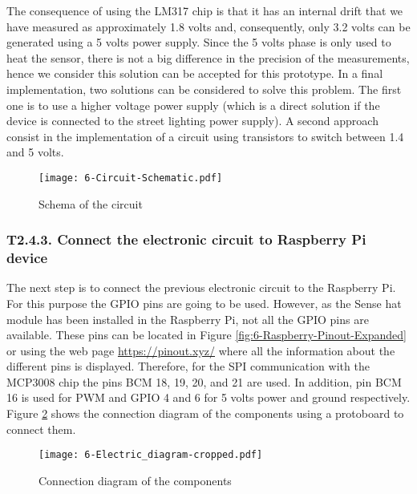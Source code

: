The consequence of using the LM317 chip is that it has an internal drift that we have measured as approximately 1.8 volts and, consequently, only 3.2 volts can be generated using a 5 volts power supply. Since the 5 volts phase is only used to heat the sensor, there is not a big difference in the precision of the measurements, hence we consider this solution can be accepted for this prototype. In a final implementation, two solutions can be considered to solve this problem. The first one is to use a higher voltage power supply (which is a direct solution if the device is connected to the street lighting power supply). A second approach consist in the implementation of a circuit using transistors to switch between 1.4 and 5 volts.


\begin{figure}[!h]
	\begin{center}
		\texttt{[image: 6-Circuit-Schematic.pdf]}
		\caption{Schema of the circuit}
		\label{fig:6-Circuit-Schematic}
	\end{center}
\end{figure}




\subsubsection{T2.4.3. Connect the electronic circuit to Raspberry Pi device}
The next step is to connect the previous electronic circuit to the Raspberry Pi. For this purpose the GPIO pins are going to be used. However, as the Sense hat module has been installed in the Raspberry Pi, not all the GPIO pins are available. These pins can be located in Figure \ref{fig:6-Raspberry-Pinout-Expanded} or using the web page \url{https://pinout.xyz/} where all the information about the different pins is displayed. Therefore, for the \ac{SPI} communication with the MCP3008 chip the pins BCM  18, 19, 20, and 21 are used. In addition, pin BCM 16 is used for \ac{PWM} and GPIO 4 and 6 for 5 volts power and ground respectively. Figure \ref{fig:6-Electric_diagram.pdf} shows the connection diagram of the components using a protoboard to connect them.

\begin{figure}[!h]
	\begin{center}
		\texttt{[image: 6-Electric\_diagram-cropped.pdf]}
		\caption{Connection diagram of the components}
		\label{fig:6-Electric_diagram.pdf}
	\end{center}
\end{figure}


